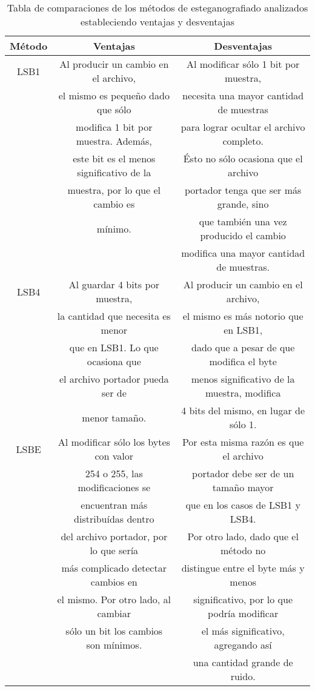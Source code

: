 \documentclass{article}
\begin{document}
\begin{table}[H]
\begin{center}
\begin{tabular}{|c|c|c|}
\hline
Método & Ventajas & Desventajas\\
\hline
\hline
LSB1 	& Al producir un cambio en el archivo, & Al modificar sólo 1 bit por muestra, \\
	& el mismo es pequeño dado que sólo & necesita una mayor cantidad de muestras \\
	& modifica 1 bit por muestra. Además, & para lograr ocultar el archivo completo.\\
	& este bit es el menos significativo de la & Ésto no sólo ocasiona que el archivo \\
	& muestra, por lo que el cambio es & portador tenga que ser más grande, sino  \\
	& mínimo. & que también una vez producido el cambio \\
	& & modifica una mayor cantidad de muestras.\\
\hline
LSB4 	& Al guardar 4 bits por muestra, &  Al producir un cambio en el archivo, \\
	& la cantidad que necesita es menor & el mismo es más notorio que en LSB1, \\
	& que en LSB1. Lo que ocasiona que & dado que a pesar de que modifica el byte \\
	& el archivo portador pueda ser de &  menos significativo de la muestra, modifica \\
	& menor tamaño. & 4 bits del mismo, en lugar de sólo 1. \\
\hline
LSBE 	& Al modificar sólo los bytes con valor & Por esta misma razón es que el archivo \\
	& 254 o 255, las modificaciones se & portador debe ser de un tamaño mayor \\
	& encuentran más distribuídas dentro & que en los casos de LSB1 y LSB4. \\
	& del archivo portador, por lo que sería & Por otro lado, dado que el método no \\
	& más complicado detectar cambios en & distingue entre el byte más y menos \\
	& el mismo. Por otro lado, al cambiar & significativo, por lo que podría modificar \\
	& sólo un bit los cambios son mínimos. & el más significativo, agregando así \\
	& & una cantidad grande de ruido. \\
\hline  
\end{tabular}
\end{center}
\caption{Tabla de comparaciones de los métodos de esteganografiado analizados estableciendo ventajas y desventajas}
\label{ventAdv}
\end{table}
\end{document}
